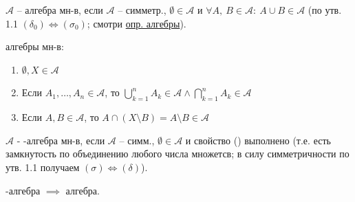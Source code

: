 \begin{definition}
    $\mathcal{A}$ -- алгебра мн-в, если $\mathcal{A}$ -- симметр., $\emptyset \in \mathcal{A}$ и $\forall A, \ B \in \mathcal{A}: \ A \cup B \in \mathcal{A}$ (по утв. 1.1 $(\delta_0) \Leftrightarrow (\sigma_0)$; смотри \href{https://ru.wikipedia.org/wiki/%D0%90%D0%BB%D0%B3%D0%B5%D0%B1%D1%80%D0%B0_%D0%BC%D0%BD%D0%BE%D0%B6%D0%B5%D1%81%D1%82%D0%B2#%D0%9E%D0%BF%D1%80%D0%B5%D0%B4%D0%B5%D0%BB%D0%B5%D0%BD%D0%B8%D0%B5}{опр. алгебры}).
\end{definition}

\begin{properties}
    алгебры мн-в: 

    \begin{enumerate}
        \item {
            $\emptyset, X \in \mathcal{A}$
        }
        \item Если $A_1, \dots, A_n \in \mathcal{A}$, то $\bigcup_{k = 1}^n A_k \in \mathcal{A} \land \bigcap_{k = 1}^n A_k \in \mathcal{A}$
        \item Если $A, B \in \mathcal{A}$, то $A \cap (X \setminus B) = A \setminus B \in \mathcal{A}$
    \end{enumerate}
\end{properties}

\begin{definition}
    $\mathcal{A}$ - \sigma-алгебра мн-в, если $\mathcal{A}$ -- симм., $\emptyset \in \mathcal{A}$ и свойство (\sigma) выполнено (т.е. есть замкнутость по объединению любого числа множетсв; в силу симметричности по утв. 1.1 получаем $(\sigma) \Leftrightarrow (\delta)$).
\end{definition}

\begin{remark}
    \sigma-алгебра $\implies$ алгебра.
\end{remark}

